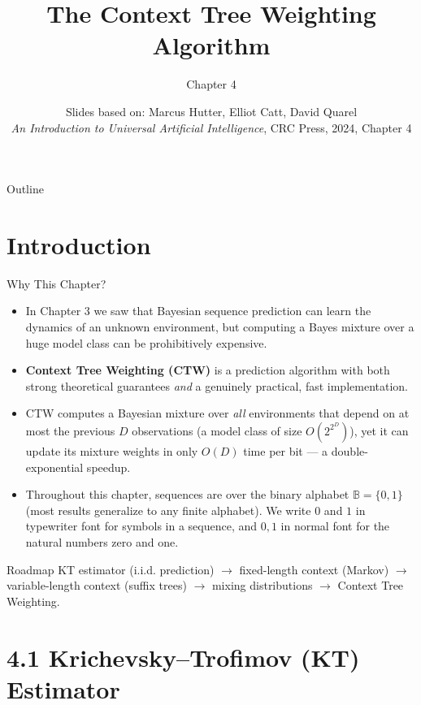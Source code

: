 \documentclass[aspectratio=169,10pt]{beamer}
\title[Chapter 4: CTW Algorithm]{The Context Tree Weighting Algorithm}
\subtitle{Chapter 4}
\author{Slides based on: Marcus Hutter, Elliot Catt, David Quarel\\
\textit{An Introduction to Universal Artificial Intelligence}, CRC Press, 2024, Chapter 4}
\date{}
\begin{document}
\begin{frame}
\titlepage
\end{frame}

\begin{frame}{Outline}
\tableofcontents
\end{frame}

\section{Introduction}
\begin{frame}{Why This Chapter?}
\begin{itemize}
\item In Chapter 3 we saw that Bayesian sequence prediction can learn the dynamics of an
unknown environment, but computing a Bayes mixture over a huge model class can be
prohibitively expensive.
\item \textbf{Context Tree Weighting (CTW)} is a prediction algorithm with both strong
theoretical guarantees \emph{and} a genuinely practical, fast implementation.
\item CTW computes a Bayesian mixture over \emph{all} environments that depend on at
most the previous $D$ observations (a model class of size $O(2^{2^D})$), yet it can update
its mixture weights in only $O(D)$ time per bit --- a double-exponential speedup.
\item Throughout this chapter, sequences are over the binary alphabet
$\mathbb{B}=\{0,1\}$ (most results generalize to any finite alphabet). We write $0$ and $1$
in typewriter font for symbols in a sequence, and $0,1$ in normal font for the natural
numbers zero and one.
\end{itemize}
\begin{block}{Roadmap}
KT estimator (i.i.d. prediction) $\to$ fixed-length context (Markov) $\to$ variable-length
context (suffix trees) $\to$ mixing distributions $\to$ Context Tree Weighting.
\end{block}
\end{frame}

\section{4.1 Krichevsky--Trofimov (KT) Estimator}
\end{document}
